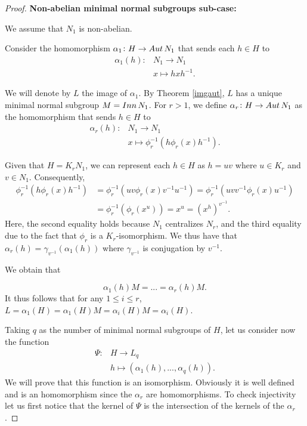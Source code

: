 \begin{proof}
\vspace{\baselineskip}
\noindent
\textbf{Non-abelian minimal normal subgroups sub-case:}
\vspace{\baselineskip}

We assume that $N_1$ is non-abelian. 

Consider the homomorphism $\alpha_1 \colon H \rightarrow Aut\, {N}_1$ that sends each $h \in H$ to
\begin{align*}
    \alpha_1(h) \colon &N_1 \rightarrow N_1 \\
                    &x \mapsto hxh^{-1}.
\end{align*}

We will denote by $L$ the image of $\alpha_1$. By Theorem \ref{imgaut}, $L$ has a unique minimal normal subgroup $M = Inn\, {N}_1$. For $r > 1$, we define $\alpha_r \colon H \rightarrow Aut\, {N}_1$ as the homomorphism that sends $h \in H$ to
\begin{align*}
    \alpha_r(h) \colon &N_1 \rightarrow N_1 \\
                    &x \mapsto \phi_r^{-1}(h\phi_r(x)h^{-1}).
\end{align*}

Given that $H = K_rN_1$, we can represent each $h \in H$ as $h = uv$ where $u \in K_r$ and $v \in N_1$. Consequently,
\begin{align*}
    \phi_r^{-1}(h\phi_r(x)h^{-1}) &= \phi_r^{-1}(uv\phi_r(x)v^{-1}u^{-1}) = \phi_r^{-1}(uvv^{-1}\phi_r(x)u^{-1}) \\
    &= \phi_r^{-1}(\phi_r(x^{u})) = x^u = (x^h)^{v^{-1}}.
\end{align*}
Here, the second equality holds because $N_1$ centralizes $N_r$, and the third equality due to the fact that $\phi_r$ is a $K_r$-isomorphism.
We thus have that $\alpha_r(h) = \gamma_{v^{-1}}(\alpha_1(h))$ where $\gamma_{v^{-1}}$ is conjugation by $v^{-1}$.

We obtain that 

$$
\alpha_1(h)M = ... = \alpha_r(h)M. 
$$
It thus follows that for any $1 \le i \le r$, $L = \alpha_1(H) = \alpha_1(H)M = \alpha_i(H)M = \alpha_i(H)$.

Taking $q$ as the number of minimal normal subgroups of $H$, let us consider now the function
\begin{align*}
    \Psi \colon &H \rightarrow L_q \\
                &h \mapsto (\alpha_1(h),..., \alpha_q(h)).
\end{align*}
We will prove that this function is an isomorphism.
Obviously it is well defined and is an homomorphism since the $\alpha_r$ are homomorphisms. To check injectivity let us first notice that the kernel of $\Psi$ is the intersection of the kernels of the $\alpha_r$. 


\end{proof}
